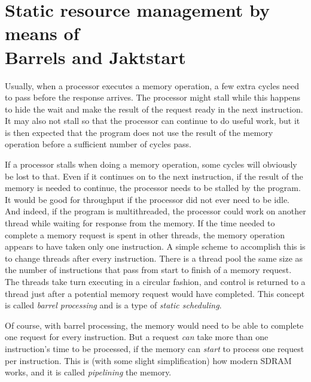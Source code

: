 \documentclass[../main/report.tex]{subfiles}
\begin{document}
\section{Static resource management by means of\\
Barrels and Jaktstart}

Usually, when a processor executes a memory operation, a few extra cycles need to pass before the response arrives.
The processor might stall while this happens to hide the wait and make the result of the request ready in the next instruction.
It may also not stall so that the processor can continue to do useful work, but it is then expected that the program does not use the result of the memory operation before a sufficient number of cycles pass.

If a processor stalls when doing a memory operation, some cycles will obviously be lost to that.
Even if it continues on to the next instruction, if the result of the memory is needed to continue, the processor needs to be stalled by the program.
It would be good for throughput if the processor did not ever need to be idle.
And indeed, if the program is multithreaded, the processor could work on another thread while waiting for response from the memory.
If the time needed to complete a memory request is spent in other threads, the memory operation appears to have taken only one instruction.
A simple scheme to accomplish this is to change threads after every instruction.
There is a thread pool the same size as the number of instructions that pass from start to finish of a memory request.
The threads take turn executing in a circular fashion, and control is returned to a thread just after a potential memory request would have completed.
This concept is called \emph{barrel processing} and is a type of \emph{static scheduling}.

Of course, with barrel processing, the memory would need to be able to complete one request for every instruction.
But a request \emph{can} take more than one instruction's time to be processed, if the memory can \emph{start} to process one request per instruction.
This is (with some slight simplification) how modern SDRAM works, and it is called \emph{pipelining} the memory.
\end{document}
